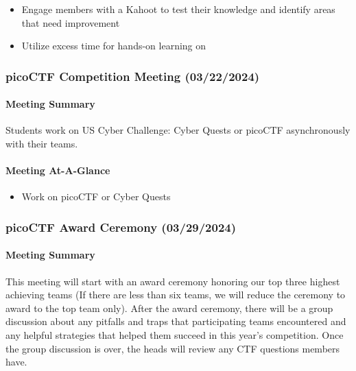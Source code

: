 \documentclass[
  letterpaper,
  DIV=11,
  numbers=noendperiod]{scrartcl}
\let\oldparagraph\paragraph
\renewcommand{\paragraph}[1]{\oldparagraph{#1}\mbox{}}
\providecommand{\tightlist}{%
  \setlength{\itemsep}{0pt}\setlength{\parskip}{0pt}}\usepackage{longtable,booktabs,array}
\begin{document}
\begin{itemize}
\tightlist
\item
  Engage members with a Kahoot to test their knowledge and identify
  areas that need improvement
\item
  Utilize excess time for hands-on learning on
\end{itemize}

\hypertarget{picoctf-competition-meeting-03222024}{%
\subsubsection{picoCTF Competition Meeting
(03/22/2024)}\label{picoctf-competition-meeting-03222024}}

\hypertarget{meeting-summary-18}{%
\paragraph{Meeting Summary}\label{meeting-summary-18}}

Students work on US Cyber Challenge: Cyber Quests or picoCTF
asynchronously with their teams.

\hypertarget{meeting-at-a-glance-18}{%
\paragraph{Meeting At-A-Glance}\label{meeting-at-a-glance-18}}

\begin{itemize}
\tightlist
\item
  Work on picoCTF or Cyber Quests
\end{itemize}

\newpage{}

\hypertarget{picoctf-award-ceremony-03292024}{%
\subsubsection{picoCTF Award Ceremony
(03/29/2024)}\label{picoctf-award-ceremony-03292024}}

\hypertarget{meeting-summary-19}{%
\paragraph{Meeting Summary}\label{meeting-summary-19}}

This meeting will start with an award ceremony honoring our top three
highest achieving teams (If there are less than six teams, we will
reduce the ceremony to award to the top team only). After the award
ceremony, there will be a group discussion about any pitfalls and traps
that participating teams encountered and any helpful strategies that
helped them succeed in this year's competition. Once the group
discussion is over, the heads will review any CTF questions members
have.
\end{document}
